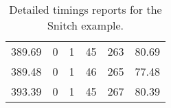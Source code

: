 \begin{table}[h]
{\begin{tabular}{cccccc}
            389.69             & 0                          & 1                          & 45                         & 263                        & 80.69                  \\
            389.48             & 0                          & 1                          & 46                         & 265                        & 77.48                  \\
            393.39             & 0                          & 1                          & 45                         & 267                        & 80.39                  \\
            \bottomrule
        \end{tabular}
    }
    \caption{Detailed timings reports for the Snitch example.}
\end{table}

